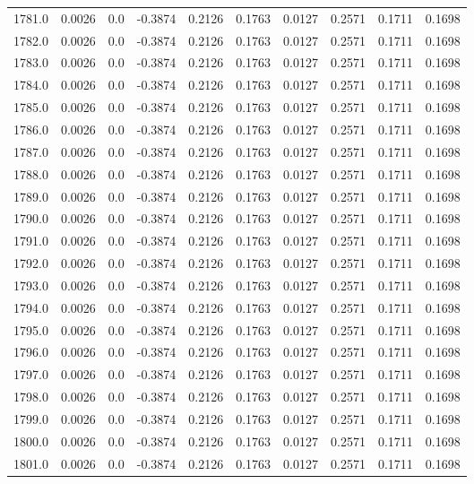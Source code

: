 \begin{longtable}{lrrrrrrrrr}
1781.0 & 0.0026 & 0.0 & -0.3874 & 0.2126 & 0.1763 & 0.0127 & 0.2571 & 0.1711 & 0.1698 \\
1782.0 & 0.0026 & 0.0 & -0.3874 & 0.2126 & 0.1763 & 0.0127 & 0.2571 & 0.1711 & 0.1698 \\
1783.0 & 0.0026 & 0.0 & -0.3874 & 0.2126 & 0.1763 & 0.0127 & 0.2571 & 0.1711 & 0.1698 \\
1784.0 & 0.0026 & 0.0 & -0.3874 & 0.2126 & 0.1763 & 0.0127 & 0.2571 & 0.1711 & 0.1698 \\
1785.0 & 0.0026 & 0.0 & -0.3874 & 0.2126 & 0.1763 & 0.0127 & 0.2571 & 0.1711 & 0.1698 \\
1786.0 & 0.0026 & 0.0 & -0.3874 & 0.2126 & 0.1763 & 0.0127 & 0.2571 & 0.1711 & 0.1698 \\
1787.0 & 0.0026 & 0.0 & -0.3874 & 0.2126 & 0.1763 & 0.0127 & 0.2571 & 0.1711 & 0.1698 \\
1788.0 & 0.0026 & 0.0 & -0.3874 & 0.2126 & 0.1763 & 0.0127 & 0.2571 & 0.1711 & 0.1698 \\
1789.0 & 0.0026 & 0.0 & -0.3874 & 0.2126 & 0.1763 & 0.0127 & 0.2571 & 0.1711 & 0.1698 \\
1790.0 & 0.0026 & 0.0 & -0.3874 & 0.2126 & 0.1763 & 0.0127 & 0.2571 & 0.1711 & 0.1698 \\
1791.0 & 0.0026 & 0.0 & -0.3874 & 0.2126 & 0.1763 & 0.0127 & 0.2571 & 0.1711 & 0.1698 \\
1792.0 & 0.0026 & 0.0 & -0.3874 & 0.2126 & 0.1763 & 0.0127 & 0.2571 & 0.1711 & 0.1698 \\
1793.0 & 0.0026 & 0.0 & -0.3874 & 0.2126 & 0.1763 & 0.0127 & 0.2571 & 0.1711 & 0.1698 \\
1794.0 & 0.0026 & 0.0 & -0.3874 & 0.2126 & 0.1763 & 0.0127 & 0.2571 & 0.1711 & 0.1698 \\
1795.0 & 0.0026 & 0.0 & -0.3874 & 0.2126 & 0.1763 & 0.0127 & 0.2571 & 0.1711 & 0.1698 \\
1796.0 & 0.0026 & 0.0 & -0.3874 & 0.2126 & 0.1763 & 0.0127 & 0.2571 & 0.1711 & 0.1698 \\
1797.0 & 0.0026 & 0.0 & -0.3874 & 0.2126 & 0.1763 & 0.0127 & 0.2571 & 0.1711 & 0.1698 \\
1798.0 & 0.0026 & 0.0 & -0.3874 & 0.2126 & 0.1763 & 0.0127 & 0.2571 & 0.1711 & 0.1698 \\
1799.0 & 0.0026 & 0.0 & -0.3874 & 0.2126 & 0.1763 & 0.0127 & 0.2571 & 0.1711 & 0.1698 \\
1800.0 & 0.0026 & 0.0 & -0.3874 & 0.2126 & 0.1763 & 0.0127 & 0.2571 & 0.1711 & 0.1698 \\
1801.0 & 0.0026 & 0.0 & -0.3874 & 0.2126 & 0.1763 & 0.0127 & 0.2571 & 0.1711 & 0.1698 \\

\end{longtable}
